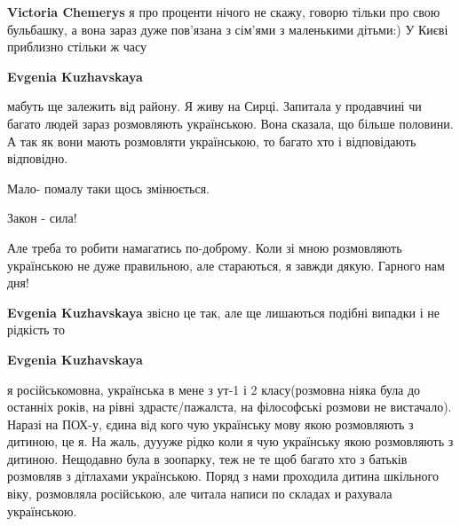 \begin{itemize}
\begin{itemize}
 
\textbf{Victoria Chemerys} я про проценти нічого не скажу, говорю тільки про свою бульбашку, а вона зараз дуже пов'язана з сім'ями з маленькими дітьми:) У Києві приблизно стільки ж часу

 
\textbf{Evgenia Kuzhavskaya} 

мабуть ще залежить від району. Я живу на Сирці. Запитала у продавчині чи багато
людей зараз розмовляють українською. Вона сказала, що більше половини. А так як
вони мають розмовляти українською, то багато хто і відповідають відповідно.

Мало- помалу таки щось змінюється.

Закон - сила!

Але треба то робити намагатись по-доброму. Коли зі мною розмовляють українською
не дуже правильною, але стараються, я завжди дякую. Гарного нам дня!



 
\textbf{Evgenia Kuzhavskaya} звісно це так, але ще лишаються подібні випадки і не рідкість то

 
\textbf{Evgenia Kuzhavskaya} 

я російськомовна, українська в мене з ут-1 і 2 класу(розмовна ніяка була до
останніх років, на рівні здрастє/пажалста, на філософські розмови не
вистачало). Наразі на ПОХ-у, єдина від кого чую українську мову якою
розмовляють з дитиною, це я. На жаль, дуууже рідко коли я чую українську якою
розмовляють з дитиною. Нещодавно була в зоопарку, теж не те щоб багато хто з
батьків розмовляв з дітлахами українською. Поряд з нами проходила дитина
шкільного віку, розмовляла російською, але читала написи по складах и рахувала
українською.


\end{itemize}
\end{itemize}
